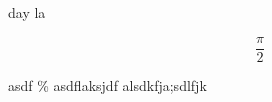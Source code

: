 \documentclass{article}
\begin{document}
day la

\begin{equation}
\frac\pi2 %
\end{equation}

asdf \% asdflaksjdf alsdkfja;sdlfjk


\end{document}
